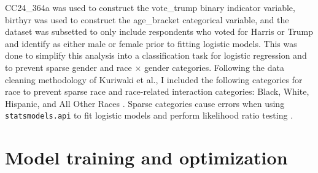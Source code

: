 \documentclass[letter]{article}
\begin{document}
CC24\_364a was used to construct the vote\_trump binary indicator variable, birthyr was used to construct the age\_bracket categorical variable, and the dataset was subsetted to only include respondents who voted for Harris or Trump and identify as either male or female prior to fitting logistic models. This was done to simplify this analysis into a classification task for logistic regression and to prevent sparse gender and race $\times$ gender categories. Following the data cleaning methodology of Kuriwaki et al., I included the following categories for race to prevent sparse race and race-related interaction categories: Black, White, Hispanic, and All Other Races \cite{kuriwaki}. Sparse categories cause errors when using \texttt{statsmodels.api} to fit logistic models and perform likelihood ratio testing \cite{statsmodels}. 
\section{Model training and optimization} \label{appendix-b}
\end{document}
